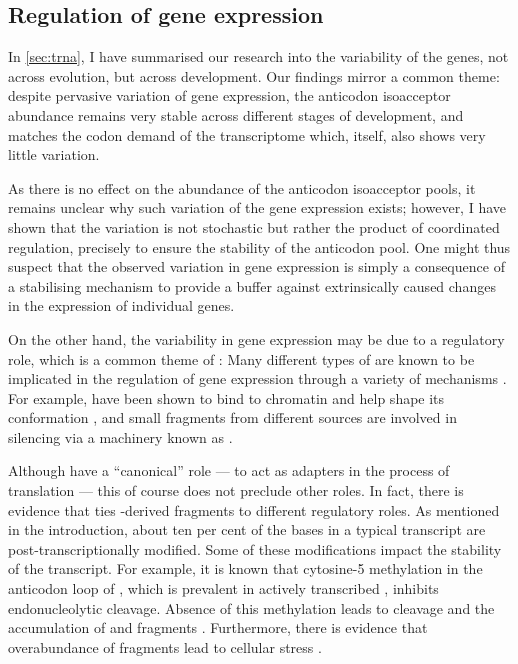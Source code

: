 \subsection{Regulation of  gene expression}

In \cref{sec:trna}, I have summarised our research into the variability of the
\trna genes, not across evolution, but across development. Our findings mirror a
common theme: despite pervasive variation of \trna gene expression, the
anticodon isoacceptor \trna abundance remains very stable across different
stages of development, and matches the codon demand of the transcriptome which,
itself, also shows very little variation.

As there is no effect on the abundance of the \trna anticodon isoacceptor pools,
it remains unclear why such variation of the \trna gene expression exists;
however, I have shown that the variation is not stochastic but rather the
product of coordinated regulation, precisely to ensure the stability of the
anticodon pool. One might thus suspect that the observed variation in \trna gene
expression is simply a consequence of a stabilising mechanism to provide a
buffer against extrinsically caused changes in the expression of individual
\trna genes.

On the other hand, the variability in \trna gene expression may be due to a
regulatory role, which is a common theme of \ncrna[s]: Many different types of
\ncrna are known to be implicated in the regulation of gene expression through a
variety of mechanisms \citep{Mattick:2006}. For example, \lncrna[s] have been
shown to bind to chromatin and help shape its conformation \citep{Rinn:2012},
and small \rna fragments from different sources are involved in \rna silencing
via a machinery known as \risc \citep{Hamilton:1999,Hammond:2000}.

Although \trna[s] have a “canonical” role — to act as adapters in the process of
translation — this of course does not preclude other roles. In fact, there is
evidence that ties \trna-derived fragments to different regulatory roles. As
mentioned in the introduction, about ten per cent of the bases in a typical
\trna[’s] transcript are post-transcriptionally modified. Some of these
modifications impact the stability of the transcript. For example, it is known
that cytosine-\num{5} methylation in the anticodon loop of \trna[s], which is
prevalent in actively transcribed \trna[s], inhibits endonucleolytic cleavage.
Absence of this methylation leads to cleavage and the accumulation of \threep
and \fivep fragments \citep{Thompson:2008}. Furthermore, there is evidence that
overabundance of \fivep \trna fragments lead to cellular stress
\citep{Blanco:2014}.


